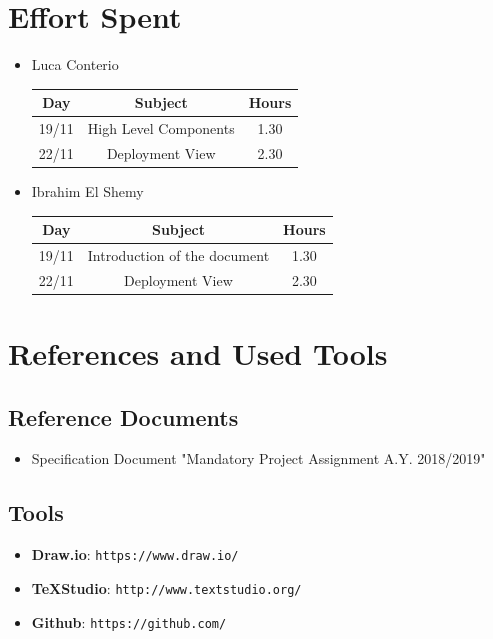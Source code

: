 \documentclass[12pt,a4paper]{article}
\begin{document}
	\section{Effort Spent}
	\begin{itemize}
		\item Luca Conterio
		\begin{center}
			\begin{tabular}{| c | c | c |}
				\hline
				Day & Subject & Hours \\ \hline
				19/11 & High Level Components & 1.30 \\ \hline
				22/11 & Deployment View & 2.30 \\ \hline
			\end{tabular}
		\end{center}

		\item Ibrahim El Shemy
		\begin{center}
			\begin{tabular}{| c | c | c |}
				\hline
				Day & Subject & Hours \\ \hline
				19/11 & Introduction of the document & 1.30 \\ \hline
				22/11 & Deployment View & 2.30 \\ \hline
			\end{tabular}
		\end{center}
	\end{itemize}
	\section{References and Used Tools}
		\subsection{Reference Documents}
			\begin{itemize}
				\item Specification Document "Mandatory Project Assignment A.Y. 2018/2019"
			\end{itemize}
		\subsection{Tools}
			\begin{itemize}
				\item \textbf{Draw.io}: \texttt{https://www.draw.io/}
				\item \textbf{TeXStudio}: \texttt{http://www.textstudio.org/}
				\item \textbf{Github}: \texttt{https://github.com/}
			\end{itemize}
		
\end{document}
